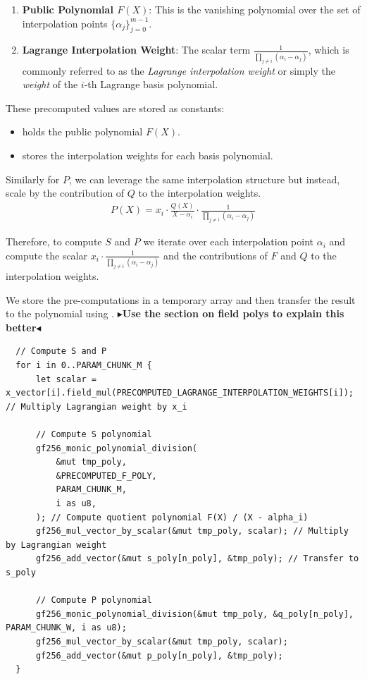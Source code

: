 \documentclass[11pt]{report}
\theoremstyle{definition}
\theoremstyle{plain}
\newcommand{\todo}[1]{{\color[rgb]{.5,0,0}\textbf{$\blacktriangleright$#1$\blacktriangleleft$}}}
\begin{document}
\begin{enumerate}
  \item \textbf{Public Polynomial $F(X)$}: This is the vanishing polynomial over the set of interpolation points $\{\alpha_j\}_{j=0}^{m-1}$.
  \item \textbf{Lagrange Interpolation Weight}: The scalar term $\frac{1}{\prod_{j \neq i} (\alpha_i - \alpha_j)}$, which is commonly referred to as the \textit{Lagrange interpolation weight} or simply the \textit{weight} of the $i$-th Lagrange basis polynomial.
\end{enumerate}

These precomputed values are stored as constants:
\begin{itemize}
  \item {} holds the public polynomial $F(X)$.
  \item {} stores the interpolation weights for each basis polynomial.
\end{itemize}

Similarly for $P$, we can leverage the same interpolation structure but instead, scale by the contribution of $Q$ to the interpolation weights.
\begin{align*}
  P(X) = x_i \cdot \frac{Q(X)}{X - \alpha_i} \cdot \frac{1}{\prod_{j\neq i}(\alpha_i - \alpha_j)}
\end{align*}

Therefore, to compute $S$ and $P$ we iterate over each interpolation point $\alpha_i$ and compute the scalar $x_i \cdot \frac{1}{\prod_{j\neq i}(\alpha_i - \alpha_j)}$ and the contributions of $F$ and $Q$ to the interpolation weights.

We store the pre-computations in a temporary array  and then transfer the result to the polynomial  using .
\todo{Use the section on field polys to explain this better}
\begin{verbatim}
  // Compute S and P
  for i in 0..PARAM_CHUNK_M {
      let scalar = x_vector[i].field_mul(PRECOMPUTED_LAGRANGE_INTERPOLATION_WEIGHTS[i]); // Multiply Lagrangian weight by x_i

      // Compute S polynomial
      gf256_monic_polynomial_division(
          &mut tmp_poly,
          &PRECOMPUTED_F_POLY,
          PARAM_CHUNK_M,
          i as u8,
      ); // Compute quotient polynomial F(X) / (X - alpha_i)
      gf256_mul_vector_by_scalar(&mut tmp_poly, scalar); // Multiply by Lagrangian weight
      gf256_add_vector(&mut s_poly[n_poly], &tmp_poly); // Transfer to s_poly

      // Compute P polynomial
      gf256_monic_polynomial_division(&mut tmp_poly, &q_poly[n_poly], PARAM_CHUNK_W, i as u8);
      gf256_mul_vector_by_scalar(&mut tmp_poly, scalar);
      gf256_add_vector(&mut p_poly[n_poly], &tmp_poly);
  }
\end{verbatim}
\end{document}
